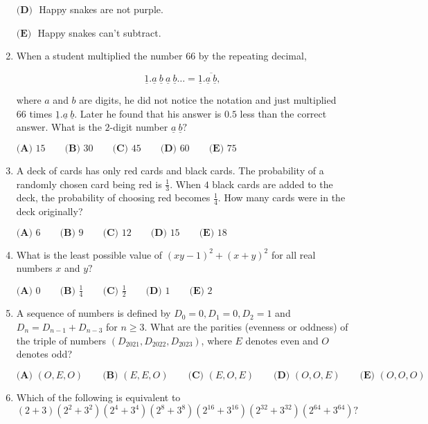 \documentclass{article}
\begin{document}
\begin{enumerate}[label=\arabic*., itemsep=0.5em]
\(\textbf{(D) }\) Happy snakes are not purple.

\(\textbf{(E) }\) Happy snakes can't subtract.\par \vspace{0.5em}\item When a student multiplied the number \(66\) by the repeating decimal, 

\begin{equation*}
\underline{1}.\underline{a} \ \underline{b} \ \underline{a} \ \underline{b}\ldots=\underline{1}.\overline{\underline{a} \ \underline{b}},
\end{equation*}
 
where \(a\) and \(b\) are digits, he did not notice the notation and just multiplied \(66\) times \(\underline{1}.\underline{a} \ \underline{b}.\) Later he found that his answer is \(0.5\) less than the correct answer. What is the \(2\)-digit number \(\underline{a} \ \underline{b}?\)

\(\textbf{(A) }15 \qquad \textbf{(B) }30 \qquad \textbf{(C) }45 \qquad \textbf{(D) }60 \qquad \textbf{(E) }75\)\par \vspace{0.5em}\item A deck of cards has only red cards and black cards. The probability of a randomly chosen card being red is \(\frac13\). When \(4\) black cards are added to the deck, the probability of choosing red becomes \(\frac14\). How many cards were in the deck originally?

\(\textbf{(A) }6 \qquad \textbf{(B) }9 \qquad \textbf{(C) }12 \qquad \textbf{(D) }15 \qquad \textbf{(E) }18\)\par \vspace{0.5em}\item What is the least possible value of \((xy-1)^2+(x+y)^2\) for all real numbers \(x\) and \(y?\)

\(\textbf{(A) }0 \qquad \textbf{(B) }\frac14 \qquad \textbf{(C) }\frac12 \qquad \textbf{(D) }1 \qquad \textbf{(E) }2\)\par \vspace{0.5em}\item A sequence of numbers is defined by \(D_0=0,D_1=0,D_2=1\) and \(D_n=D_{n-1}+D_{n-3}\) for \(n\ge 3\). What are the parities (evenness or oddness) of the triple of numbers \((D_{2021},D_{2022},D_{2023})\), where \(E\) denotes even and \(O\) denotes odd?

\(\textbf{(A) }(O,E,O) \qquad \textbf{(B) }(E,E,O) \qquad \textbf{(C) }(E,O,E) \qquad \textbf{(D) }(O,O,E) \qquad \textbf{(E) }(O,O,O)\)\par \vspace{0.5em}\item Which of the following is equivalent to
\begin{equation*}
(2+3)(2^2+3^2)(2^4+3^4)(2^8+3^8)(2^{16}+3^{16})(2^{32}+3^{32})(2^{64}+3^{64})?
\end{equation*}


\end{enumerate}
\end{document}

